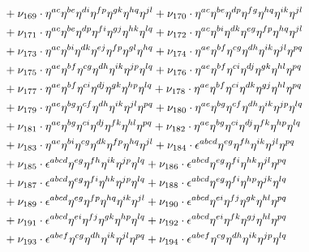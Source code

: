 \documentclass[a4paper,12pt, DIV=14, BCOR=5mm, twoside, headsepline]{scrbook}
\begin{document}
\begin{align}
\begin{alignedat}{2}
& & &\hphantom{=}
+\nu_{169}\cdot\eta^{ac}\eta^{be}\eta^{di}\eta^{fp}\eta^{gk}\eta^{hq}\eta^{jl}+\nu_{170}\cdot\eta^{ac}\eta^{be}\eta^{dp}\eta^{fg}\eta^{hq}\eta^{ik}\eta^{jl}\\
& & &\hphantom{=}
+\nu_{171}\cdot\eta^{ac}\eta^{be}\eta^{dp}\eta^{fi}\eta^{gj}\eta^{hk}\eta^{lq}+\nu_{172}\cdot\eta^{ac}\eta^{bi}\eta^{dk}\eta^{eg}\eta^{fp}\eta^{hq}\eta^{jl}\\
& & &\hphantom{=}
+\nu_{173}\cdot\eta^{ac}\eta^{bi}\eta^{dk}\eta^{ej}\eta^{fp}\eta^{gl}\eta^{hq}+\nu_{174}\cdot\eta^{ae}\eta^{bf}\eta^{cg}\eta^{dh}\eta^{ik}\eta^{jl}\eta^{pq}\\
& & &\hphantom{=}
+\nu_{175}\cdot\eta^{ae}\eta^{bf}\eta^{cg}\eta^{dh}\eta^{ik}\eta^{jp}\eta^{lq}+\nu_{176}\cdot\eta^{ae}\eta^{bf}\eta^{ci}\eta^{dj}\eta^{gk}\eta^{hl}\eta^{pq}\\
& & &\hphantom{=}
+\nu_{177}\cdot\eta^{ae}\eta^{bf}\eta^{ci}\eta^{dj}\eta^{gk}\eta^{hp}\eta^{lq}+\nu_{178}\cdot\eta^{ae}\eta^{bf}\eta^{ci}\eta^{dk}\eta^{gj}\eta^{hl}\eta^{pq}\\
& & &\hphantom{=}
+\nu_{179}\cdot\eta^{ae}\eta^{bg}\eta^{cf}\eta^{dh}\eta^{ik}\eta^{jl}\eta^{pq}+\nu_{180}\cdot\eta^{ae}\eta^{bg}\eta^{cf}\eta^{dh}\eta^{ik}\eta^{jp}\eta^{lq}\\
& & &\hphantom{=}
+\nu_{181}\cdot\eta^{ae}\eta^{bg}\eta^{ci}\eta^{dj}\eta^{fk}\eta^{hl}\eta^{pq}+\nu_{182}\cdot\eta^{ae}\eta^{bg}\eta^{ci}\eta^{dj}\eta^{fk}\eta^{hp}\eta^{lq}\\
& & &\hphantom{=}
+\nu_{183}\cdot\eta^{ae}\eta^{bi}\eta^{cg}\eta^{dk}\eta^{fp}\eta^{hq}\eta^{jl}+ \nu_{184}\cdot\epsilon^{abcd}\eta^{eg}\eta^{fh}\eta^{ik}\eta^{jl}\eta^{pq}\\
& & &\hphantom{=}
+\nu_{185}\cdot\epsilon^{abcd}\eta^{eg}\eta^{fh}\eta^{ik}\eta^{jp}\eta^{lq}+\nu_{186}\cdot\epsilon^{abcd}\eta^{eg}\eta^{fi}\eta^{hk}\eta^{jl}\eta^{pq}
\\
& & &\hphantom{=}
+\nu_{187}\cdot\epsilon^{abcd}\eta^{eg}\eta^{fi}\eta^{hk}\eta^{jp}\eta^{lq}+\nu_{188}\cdot\epsilon^{abcd}\eta^{eg}\eta^{fi}\eta^{hp}\eta^{jk}\eta^{lq}\\
& & &\hphantom{=}
+\nu_{189}\cdot\epsilon^{abcd}\eta^{eg}\eta^{fp}\eta^{hq}\eta^{ik}\eta^{jl}+\nu_{190}\cdot\epsilon^{abcd}\eta^{ei}\eta^{fj}\eta^{gk}\eta^{hl}\eta^{pq}\\
& & &\hphantom{=}
+\nu_{191}\cdot\epsilon^{abcd}\eta^{ei}\eta^{fj}\eta^{gk}\eta^{hp}\eta^{lq}+\nu_{192}\cdot\epsilon^{abcd}\eta^{ei}\eta^{fk}\eta^{gj}\eta^{hl}\eta^{pq}\\
& & &\hphantom{=}
+\nu_{193}\cdot\epsilon^{abef}\eta^{cg}\eta^{dh}\eta^{ik}\eta^{jl}\eta^{pq}+\nu_{194}\cdot\epsilon^{abef}\eta^{cg}\eta^{dh}\eta^{ik}\eta^{jp}\eta^{lq}\\

\end{alignedat}
\end{align}
\end{document}
